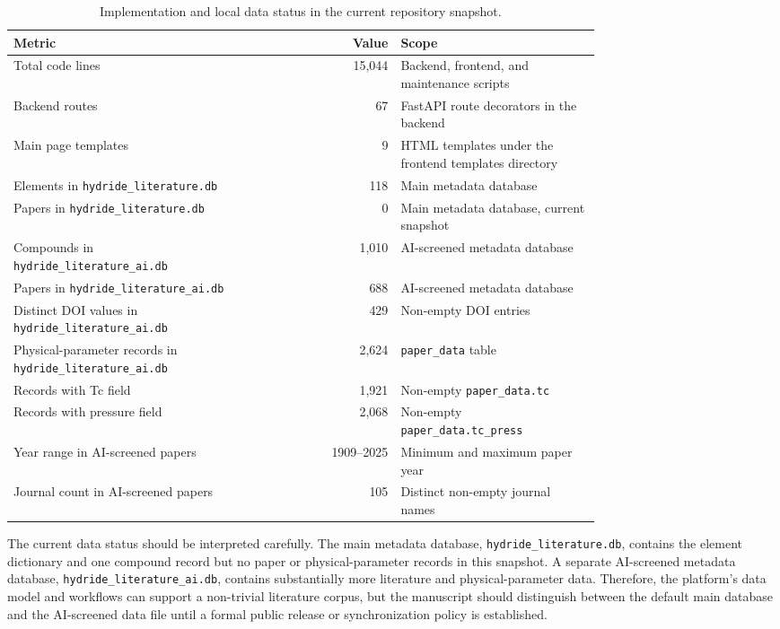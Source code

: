 \documentclass[11pt,a4paper]{article}
\begin{document}
\begin{table}[t]
\centering
\caption{Implementation and local data status in the current repository snapshot.}
\label{tab:status}
\begin{tabular}{>{\raggedright\arraybackslash}p{0.42\linewidth} r >{\raggedright\arraybackslash}p{0.34\linewidth}}
\toprule
Metric & Value & Scope \\
\midrule
Total code lines & 15,044 & Backend, frontend, and maintenance scripts \\
Backend routes & 67 & FastAPI route decorators in the backend \\
Main page templates & 9 & HTML templates under the frontend templates directory \\
Elements in \texttt{hydride\_literature.db} & 118 & Main metadata database \\
Papers in \texttt{hydride\_literature.db} & 0 & Main metadata database, current snapshot \\
Compounds in \texttt{hydride\_literature\_ai.db} & 1,010 & AI-screened metadata database \\
Papers in \texttt{hydride\_literature\_ai.db} & 688 & AI-screened metadata database \\
Distinct DOI values in \texttt{hydride\_literature\_ai.db} & 429 & Non-empty DOI entries \\
Physical-parameter records in \texttt{hydride\_literature\_ai.db} & 2,624 & \texttt{paper\_data} table \\
Records with Tc field & 1,921 & Non-empty \texttt{paper\_data.tc} \\
Records with pressure field & 2,068 & Non-empty \texttt{paper\_data.tc\_press} \\
Year range in AI-screened papers & 1909--2025 & Minimum and maximum paper year \\
Journal count in AI-screened papers & 105 & Distinct non-empty journal names \\
\bottomrule
\end{tabular}
\end{table}

The current data status should be interpreted carefully. The main metadata database, \texttt{hydride\_literature.db}, contains the element dictionary and one compound record but no paper or physical-parameter records in this snapshot. A separate AI-screened metadata database, \texttt{hydride\_literature\_ai.db}, contains substantially more literature and physical-parameter data. Therefore, the platform's data model and workflows can support a non-trivial literature corpus, but the manuscript should distinguish between the default main database and the AI-screened data file until a formal public release or synchronization policy is established.
\end{document}
